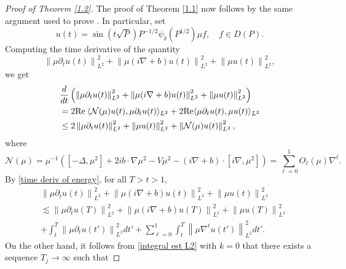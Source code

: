 \documentclass[11pt]{amsart}
\numberwithin{equation}{section}
\def\Re{{\rm Re}\:}
\begin{document}
\begin{proof}[Proof of Theorem \ref{1.2}]

The proof of Theorem \ref{1.1} now follows by the same argument used to prove \cite[Theorem 1.1]{kn:LSV}. In particular, set
\begin{equation*}
u(t) = \sin(t \sqrt{P}) P^{-1/2} \psi_\delta(P^{1/2}) \mu f,\quad f \in D(P).
\end{equation*}
Computing the time derivative of the quantity 
\begin{equation*}
\left\|\mu \partial_tu(t)\right\|^2_{L^2}+\left\|\mu(i\nabla+b)u(t)\right\|^2_{L^2}
+\left\|\mu u(t)\right\|^2_{L^2}, 
\end{equation*}
we get
\begin{equation}\label{time deriv of energy}
\begin{split}
&\frac{d}{dt}\left(\left\|\mu \partial_tu(t)\right\|^2_{L^2}+\left\|\mu(i\nabla+b)u(t)\right\|^2_{L^2}
+\left\|\mu u(t)\right\|^2_{L^2}\right)\\
&=2{\rm \Re}\langle \mathcal{N}(\mu)u(t),\mu \partial_tu(t)\rangle_{L^2} + 2{\rm Re}\langle\mu\partial_t u(t),\mu u(t)\rangle_{L^2}\\
&\le 2\left\|\mu \partial_tu(t)\right\|^2_{L^2}+\left\|\mu u(t)\right\|^2_{L^2}+\left\|\mathcal{N}(\mu)u(t)\right\|^2_{L^2},
\end{split}
\end{equation}
where
\begin{equation*}
\mathcal{N}(\mu)=\mu^{-1}\left([-\Delta, \mu^2] + 2ib \cdot \nabla \mu^2 - V \mu^2 - (i\nabla+b)\cdot[i\nabla,\mu^2]\right) =
\sum_{\ell=0}^1O_{\ell}(\mu)\nabla^{\ell}.
\end{equation*}
By \eqref{time deriv of energy}, for all $T>t>1$, 
\begin{equation} \label{apply FTC}
\begin{split}
&\left\|\mu \partial_tu(t)\right\|_{L^2}^2+\left\|\mu(i\nabla+b)u(t)\right\|_{L^2}^2+\left\|\mu u(t)\right\|_{L^2}^2\\
&\lesssim \left\|\mu \partial_tu(T)\right\|_{L^2}^2+\left\|\mu(i\nabla+b)u(T)\right\|_{L^2}^2+\left\|\mu u(T)\right\|_{L^2}^2\\
&+\int_t^T\left\|\mu\partial_t u(t')\right\|_{L^2}^2dt'+\sum_{\ell=0}^1\int_t^T\left\|\mu\nabla^{\ell}u(t')\right\|_{L^2}^2dt'.
\end{split}
\end{equation}
On the other hand, it follows from \eqref{integral est L2} with $k=0$ that there exists a sequence $T_j\to\infty$ such that

\end{proof}
\end{document}
